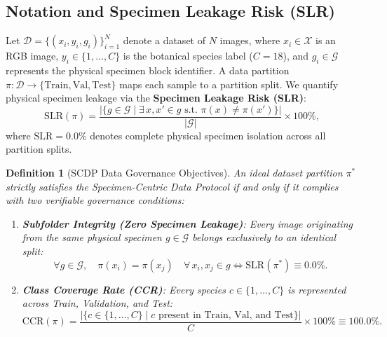 \documentclass[a4paper,fleqn]{cas-sc}
\newtheorem{definition}{Definition}
\begin{document}
\subsection{Notation and Specimen Leakage Risk (SLR)}
Let $\mathcal{D} = \{(x_i, y_i, g_i)\}_{i=1}^N$ denote a dataset of $N$ images, where $x_i \in \mathcal{X}$ is an RGB image, $y_i \in \{1, \dots, C\}$ is the botanical species label ($C=18$), and $g_i \in \mathcal{G}$ represents the physical specimen block identifier. A data partition $\pi: \mathcal{D} \to \{\text{Train}, \text{Val}, \text{Test}\}$ maps each sample to a partition split. We quantify physical specimen leakage via the \textbf{Specimen Leakage Risk (SLR)}:
\begin{equation}
\mathrm{SLR}(\pi) = \frac{\left|\{g \in \mathcal{G} \mid \exists\, x, x' \in g \text{ s.t. } \pi(x) \neq \pi(x')\}\right|}{|\mathcal{G}|} \times 100\%,
\label{eq:slr}
\end{equation}
where $\mathrm{SLR}=0.0\%$ denotes complete physical specimen isolation across all partition splits.

\begin{definition}[SCDP Data Governance Objectives]
An ideal dataset partition $\pi^*$ strictly satisfies the Specimen-Centric Data Protocol if and only if it complies with two verifiable governance conditions:
\begin{enumerate}
\item[(i)] \textbf{Subfolder Integrity (Zero Specimen Leakage)}: Every image originating from the same physical specimen $g \in \mathcal{G}$ belongs exclusively to an identical split:
\begin{equation}
\forall g \in \mathcal{G}, \quad \pi(x_i) = \pi(x_j) \quad \forall\, x_i, x_j \in g \iff \mathrm{SLR}(\pi^*) \equiv 0.0\%.
\label{eq:subfolder_integrity}
\end{equation}
\item[(ii)] \textbf{Class Coverage Rate (CCR)}: Every species $c \in \{1, \dots, C\}$ is represented across Train, Validation, and Test:
\begin{equation}
\mathrm{CCR}(\pi) = \frac{\left|\{c \in \{1,\dots,C\} \mid c \text{ present in Train, Val, and Test}\}\right|}{C} \times 100\% \equiv 100.0\%.
\label{eq:ccr}
\end{equation}
\end{enumerate}
\end{definition}
\end{document}
